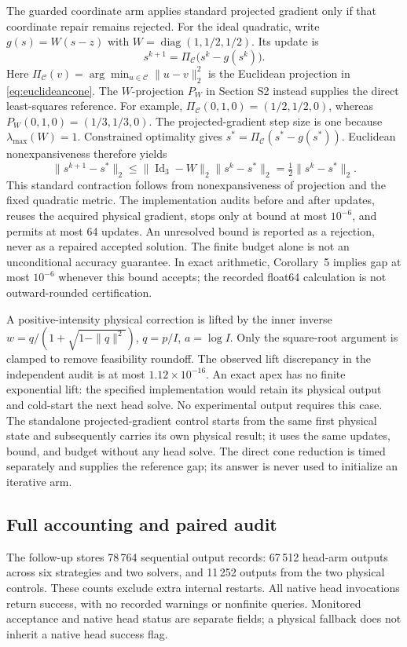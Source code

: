 \documentclass[10pt,a4paper]{article}
\begin{document}
The guarded coordinate arm applies standard projected gradient only if that coordinate repair remains rejected. For the ideal quadratic, write $g(s)=W(s-z)$ with $W=\operatorname{diag}(1,1/2,1/2)$. Its update is
\begin{equation}
 s^{k+1}=\Pi_{\mathcal C}\bigl(s^k-g(s^k)\bigr).
 \label{eq:physicalpg}
\end{equation}
Here $\Pi_{\mathcal C}(v)=\arg\min_{u\in\mathcal C}\|u-v\|_2^2$ is the Euclidean projection in \eqref{eq:euclideancone}. The $W$-projection $P_W$ in Section S2 instead supplies the direct least-squares reference. For example, $\Pi_{\mathcal C}(0,1,0)=(1/2,1/2,0)$, whereas $P_W(0,1,0)=(1/3,1/3,0)$. The projected-gradient step size is one because $\lambda_{\max}(W)=1$. Constrained optimality gives $s^*=\Pi_{\mathcal C}(s^*-g(s^*))$. Euclidean nonexpansiveness therefore yields
\begin{equation}
 \|s^{k+1}-s^*\|_2\le\|\operatorname{Id}_3-W\|_2\|s^k-s^*\|_2
 =\tfrac12\|s^k-s^*\|_2.
 \label{eq:pgcontraction}
\end{equation}
This standard contraction follows from nonexpansiveness of projection and the fixed quadratic metric. The implementation audits before and after updates, reuses the acquired physical gradient, stops only at bound at most $10^{-6}$, and permits at most 64 updates. An unresolved bound is reported as a rejection, never as a repaired accepted solution. The finite budget alone is not an unconditional accuracy guarantee. In exact arithmetic, Corollary~5 implies gap at most $10^{-6}$ whenever this bound accepts; the recorded float64 calculation is not outward-rounded certification.

A positive-intensity physical correction is lifted by the inner inverse $w=q/(1+\sqrt{1-\|q\|^2})$, $q=p/I$, $a=\log I$. Only the square-root argument is clamped to remove feasibility roundoff. The observed lift discrepancy in the independent audit is at most $1.12\times10^{-16}$. An exact apex has no finite exponential lift: the specified implementation would retain its physical output and cold-start the next head solve. No experimental output requires this case. The standalone projected-gradient control starts from the same first physical state and subsequently carries its own physical result; it uses the same updates, bound, and budget without any head solve. The direct cone reduction is timed separately and supplies the reference gap; its answer is never used to initialize an iterative arm.

\subsection{Full accounting and paired audit}
The follow-up stores 78\,764 sequential output records: 67\,512 head-arm outputs across six strategies and two solvers, and 11\,252 outputs from the two physical controls. These counts exclude extra internal restarts. All native head invocations return success, with no recorded warnings or nonfinite queries. Monitored acceptance and native head status are separate fields; a physical fallback does not inherit a native head success flag.
\end{document}
